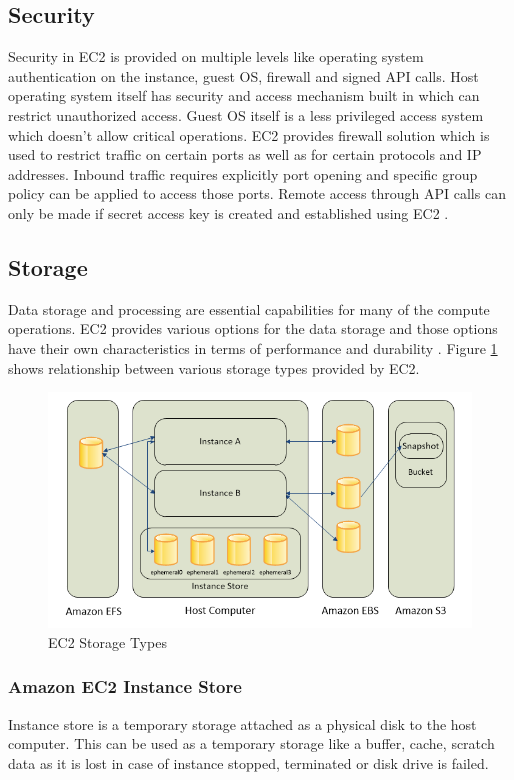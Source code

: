 \subsection{Security}
Security in EC2 is provided on multiple levels like operating system authentication on the instance, guest OS, firewall and signed API calls. Host operating system itself has security and access mechanism built in which can restrict unauthorized access. Guest OS itself is a less privileged access system which doesn't allow critical operations. EC2 provides firewall solution which is used to restrict traffic on certain ports as well as for certain protocols and IP addresses. Inbound traffic requires explicitly port opening and specific group policy can be applied to access those ports. Remote access through API calls can only be made if secret access key is created and established using EC2 \cite{hid-sp18-402-www-aws-ec2Security}.

\subsection{Storage}
Data storage and processing are essential capabilities for many of the compute operations. EC2 provides various options for the data storage and those options have their own characteristics in terms of performance and durability \cite{hid-sp18-402-www-aws-ec2Storage}. Figure \ref{f:ec2-storage} shows relationship between various storage types provided by EC2.
\begin{figure}[!ht]
  \centering\includegraphics[width=\columnwidth]{images/ec2Storage.PNG}
  \caption{EC2 Storage Types \cite{hid-sp18-402-www-aws-ec2Storage}}\label{f:ec2-storage}
\end{figure}

\subsubsection{Amazon EC2 Instance Store} 
Instance store \cite{hid-sp18-402-www-aws-ec2Storage} is a temporary storage attached as a physical disk to the host computer. This can be used as a temporary storage like a buffer, cache, scratch data as it is lost in case of instance stopped, terminated or disk drive is failed.
